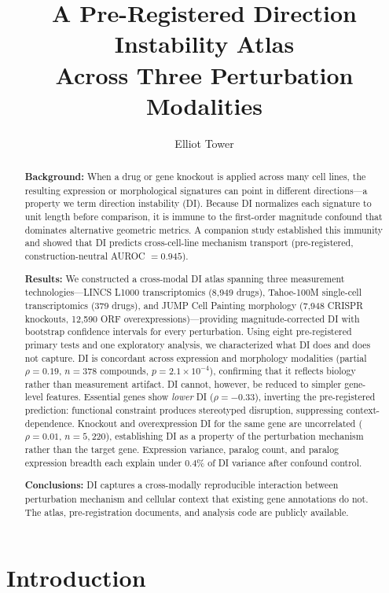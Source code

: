 \documentclass[11pt]{article}
\title{A Pre-Registered Direction Instability Atlas\\
Across Three Perturbation Modalities}
\author{Elliot Tower}
\affil{Independent researcher \\ \texttt{elliot@elliottower.ai}}
\date{}
\begin{document}
\maketitle

\begin{abstract}
\textbf{Background:}
When a drug or gene knockout is applied across many cell lines, the
resulting expression or morphological signatures can point in different
directions---a property we term direction instability (DI).  Because DI
normalizes each signature to unit length before comparison, it is immune
to the first-order magnitude confound that dominates alternative
geometric metrics.  A companion study established this immunity and
showed that DI predicts cross-cell-line mechanism transport
(pre-registered, construction-neutral AUROC $= 0.945$).

\textbf{Results:}
We constructed a cross-modal DI atlas spanning three measurement
technologies---LINCS L1000 transcriptomics (8{,}949 drugs), Tahoe-100M
single-cell transcriptomics (379 drugs), and JUMP Cell Painting
morphology (7{,}948 CRISPR knockouts, 12{,}590 ORF
overexpressions)---providing magnitude-corrected DI with bootstrap
confidence intervals for every perturbation.  Using eight pre-registered
primary tests and one exploratory analysis, we characterized what DI
does and does not capture.  DI is
concordant across expression and morphology modalities (partial
$\rho = 0.19$, $n = 378$ compounds, $p = 2.1 \times 10^{-4}$),
confirming that it reflects biology rather than measurement artifact.
DI cannot, however, be reduced to simpler gene-level features.
Essential genes show \emph{lower} DI ($\rho = -0.33$), inverting the
pre-registered prediction: functional constraint produces stereotyped
disruption, suppressing context-dependence.  Knockout and overexpression
DI for the same gene are uncorrelated ($\rho = 0.01$,
$n = 5{,}220$), establishing DI as a property of the perturbation
mechanism rather than the target gene.  Expression variance, paralog
count, and paralog expression breadth each explain under 0.4\% of DI
variance after confound control.

\textbf{Conclusions:}
DI captures a cross-modally reproducible interaction between
perturbation mechanism and cellular context that existing gene
annotations do not.  The atlas, pre-registration documents, and analysis
code are publicly available.
\end{abstract}


\section{Introduction}
\end{document}
